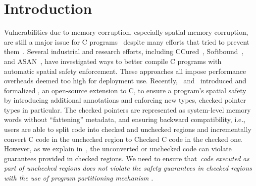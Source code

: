 \section{Introduction}\label{sec:intros}

Vulnerabilities due to memory corruption, especially spatial memory corruption, 
are still a major issue for C programs~\cite{cvetrend, microsoftmemsafe, Zeng:2013:SRF:2534766.2534798} 
despite many efforts that tried to prevent them~\cite{song2019sanitizing}.
Several industrial and research efforts, including CCured~\cite{Necula2005},
Softbound~\cite{softbound}, and ASAN~\cite{Serebryany2012},
have investigated ways to better compile C programs with automatic spatial safety enforcement.
These approaches all impose performance overheads deemed too high for deployment use. 
% 
Recently,~\citet{Elliott2018} and~\citet{li22checkedc} introduced and formalized \checkedc, an
open-source extension to C,
to ensure a program’s spatial safety by introducing additional annotations and
enforcing new types, checked pointer types in particular.
%
The checked pointers are represented as system-level memory words without ``fattening'' metadata, 
and ensuring backward compatibility, i.e.,
users are able to split code into checked and unchecked regions and incrementally convert
C code in the unchecked region to Checked C code in the checked one.
However, as we explain in~, the
unconverted or unchecked code can violate guarantees provided in checked
regions.
%
We need to ensure that~\emph{code executed as part of 
unchecked regions does not violate the safety guarantees in checked regions  with the use of program partitioning mechanism \cite{rul2009towards}}.

